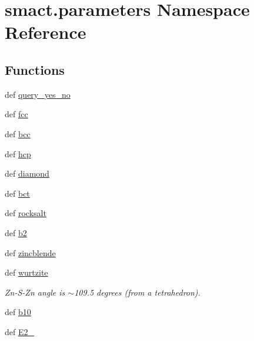\hypertarget{namespacesmact_1_1parameters}{}\section{smact.\+parameters Namespace Reference}
\label{namespacesmact_1_1parameters}
\subsection*{Functions}
\begin{DoxyCompactItemize}
\item 
def \hyperlink{namespacesmact_1_1parameters_a0a7b9cfac24902170e135aa34e25f674}{query\+\_\+yes\+\_\+no}
\item 
def \hyperlink{namespacesmact_1_1parameters_a16867ca20c91dd8b7f4d519b220b08e3}{fcc}
\item 
def \hyperlink{namespacesmact_1_1parameters_a1bae56380a1d36c8c0a2fe0323fb1ba5}{bcc}
\item 
def \hyperlink{namespacesmact_1_1parameters_a1e720a4abb24a6ab1e663e1ac70b1db1}{hcp}
\item 
def \hyperlink{namespacesmact_1_1parameters_a7acfd40bb068480e79670cfe1960f21d}{diamond}
\item 
def \hyperlink{namespacesmact_1_1parameters_a16ccefd0b7e9ced870e9bb28cd9caa18}{bct}
\item 
def \hyperlink{namespacesmact_1_1parameters_afde267246e2f4aded9e49557939c2a0b}{rocksalt}
\item 
def \hyperlink{namespacesmact_1_1parameters_a6517436ba44653f21ddbb58b73b8fb84}{b2}
\item 
def \hyperlink{namespacesmact_1_1parameters_a3b2f879f7fa985be9f19a9991addb20e}{zincblende}
\item 
def \hyperlink{namespacesmact_1_1parameters_ab26b2a7bf4ad5538de465332c1a7c09b}{wurtzite}
\begin{DoxyCompactList}\small\item\em Zn-\/\+S-\/\+Zn angle is $\sim$109.5 degrees (from a tetrahedron). \end{DoxyCompactList}\item 
def \hyperlink{namespacesmact_1_1parameters_afca249beab0792afc200ee2fc1714fbe}{b10}
\item 
def \hyperlink{namespacesmact_1_1parameters_a65318bbc38b59562936b20c221a64a22}{E2\+\_}
\end{DoxyCompactItemize}
